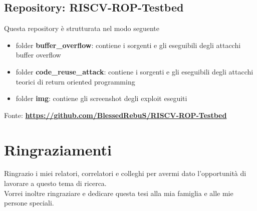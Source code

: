 \subsection*{Repository: RISCV-ROP-Testbed}
Questa repository è strutturata nel modo seguente
\begin{itemize}
\item folder \textbf{buffer\_overflow}: contiene i sorgenti e gli eseguibili degli attacchi buffer overflow
\item folder \textbf{code\_reuse\_attack}: contiene i sorgenti e gli eseguibili degli attacchi teorici di return oriented programming
\item folder \textbf{img}: contiene gli screenshot degli exploit eseguiti
\end{itemize}
Fonte: \href{https://github.com/BlessedRebuS/RISCV-ROP-Testbed}{\textbf{https://github.com/BlessedRebuS/RISCV-ROP-Testbed}}
\newpage
\section*{Ringraziamenti}
Ringrazio i miei relatori, correlatori e colleghi per avermi dato l’opportunità di lavorare a questo tema di ricerca.\\
\newline
Vorrei inoltre ringraziare e dedicare questa tesi alla mia famiglia e alle mie persone speciali.
\newpage
\myemptypage
\printbibliography
\listoffigures
